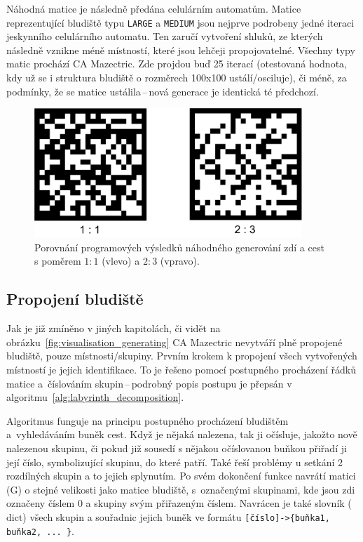 Náhodná matice je následně předána celulárním automatům. Matice reprezentující bludiště typu \verb|LARGE| a \verb|MEDIUM| jsou nejprve podrobeny jedné iteraci jeskynního celulárního automatu. Ten zaručí vytvoření shluků, ze kterých následně vznikne méně místností, které jsou lehčeji propojovatelné. Všechny typy matic prochází CA Mazectric. Zde projdou buď 25 iterací (otestovaná hodnota, kdy už se i struktura bludiště o rozměrech 100x100 ustálí/osciluje), či méně, za podmínky, že se matice ustálila\,--\,nová generace je identická té předchozí.

\begin{figure}[H]
    \centering
    \includegraphics[width=0.9\textwidth]{obrazky-figures/ch4/randi.pdf}
    \caption{Porovnání programových výsledků náhodného generování zdí a cest s poměrem $1:1$ (vlevo) a $2:3$ (vpravo).}
    \label{fig:randi}
\end{figure}

\subsection*{Propojení bludiště}
Jak je již zmíněno v jiných kapitolách, či vidět na obrázku~\ref{fig:visualisation_generating} CA Mazectric nevytváří plně propojené bludiště, pouze místnosti/skupiny. Prvním krokem k propojení všech vytvořených místností je jejich identifikace. To je řešeno pomocí postupného procházení řádků matice a~číslováním skupin\,--\,podrobný popis postupu je přepsán v algoritmu~\ref{alg:labyrinth_decomposition}. 

Algoritmus funguje na principu postupného procházení bludištěm a~vyhledáváním buněk cest. Když je nějaká nalezena, tak ji očísluje, jakožto nově nalezenou skupinu, či pokud již sousedí s nějakou očíslovanou buňkou přiřadí ji její číslo, symbolizující skupinu, do které patří. Také řeší problémy u setkání 2 rozdílných skupin a to jejich splynutím. Po svém dokončení funkce navrátí matici ($\text{G}$) o stejné velikosti jako matice bludiště, s~označenými skupinami, kde jsou zdi označeny číslem 0 a skupiny svým přiřazeným číslem. Navrácen je také slovník ($\text{dict}$) všech skupin a souřadnic jejich buněk ve formátu \verb|[číslo]->{buňka1, buňka2, ... }|.

